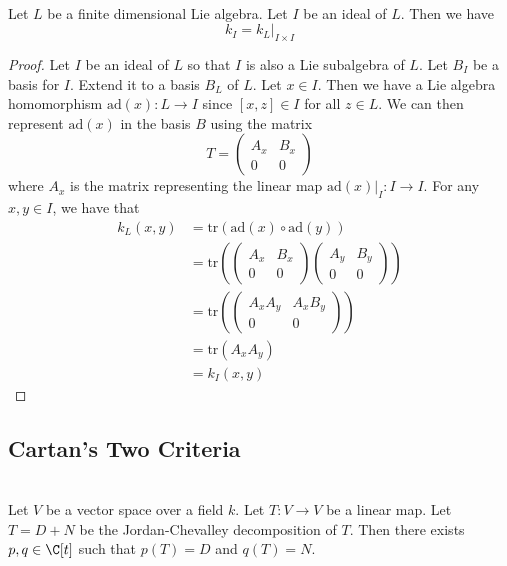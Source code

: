 \documentclass[a4paper]{article}
\begin{document}
\begin{lmm}{}{} \\Let $L$ be a finite dimensional Lie algebra. Let $I$ be an ideal of $L$. Then we have $$k_I=k_L|_{I\times I}$$ 
\begin{proof}
Let $I$ be an ideal of $L$ so that $I$ is also a Lie subalgebra of $L$. Let $B_I$ be a basis for $I$. Extend it to a basis $B_L$ of $L$. Let $x\in I$. Then we have a Lie algebra homomorphism $\text{ad}(x):L\to I$ since $[x,z]\in I$ for all $z\in L$. We can then represent $\text{ad}(x)$ in the basis $B$ using the matrix $$T=\begin{pmatrix}
A_x & B_x\\
0 & 0
\end{pmatrix}$$ where $A_x$ is the matrix representing the linear map $\text{ad}(x)|_I:I\to I$. For any $x,y\in I$, we have that 
\begin{align*}
k_L(x,y)&=\text{tr}(\text{ad}(x)\circ\text{ad}(y))\\
&=\text{tr}\left(\begin{pmatrix}
A_x & B_x\\
0 & 0
\end{pmatrix}\begin{pmatrix}
A_y & B_y\\
0 & 0
\end{pmatrix}\right)\\
&=\text{tr}\left(\begin{pmatrix}
A_xA_y & A_xB_y\\
0 & 0
\end{pmatrix}\right)\\
&=\text{tr}(A_xA_y)\\
&=k_I(x,y)
\end{align*}
\end{proof}
\end{lmm}

\subsection{Cartan's Two Criteria}
\begin{lmm}{}{} \\Let $V$ be a vector space over a field $k$. Let $T:V\to V$ be a linear map. Let $T=D+N$ be the Jordan-Chevalley decomposition of $T$. Then there exists $p,q\in\C[t]$ such that $p(T)=D$ and $q(T)=N$. 
\end{lmm}
\end{document}
